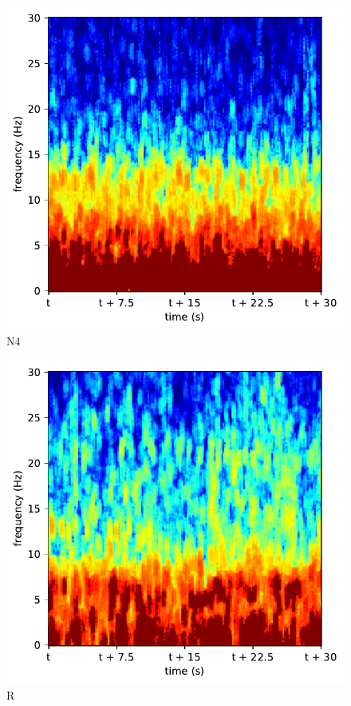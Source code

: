 \begin{subfigure}{.16\textwidth}
  \centering
  \includegraphics[width=1\linewidth]{./pics/class_clean_4}
  \caption{N4}
  \label{fig_1_15}
\end{subfigure}%
\begin{subfigure}{.16\textwidth}
  \centering
  \includegraphics[width=1\linewidth]{./pics/class_clean_5}
  \caption{R}
  \label{fig_1_16}
\end{subfigure}



